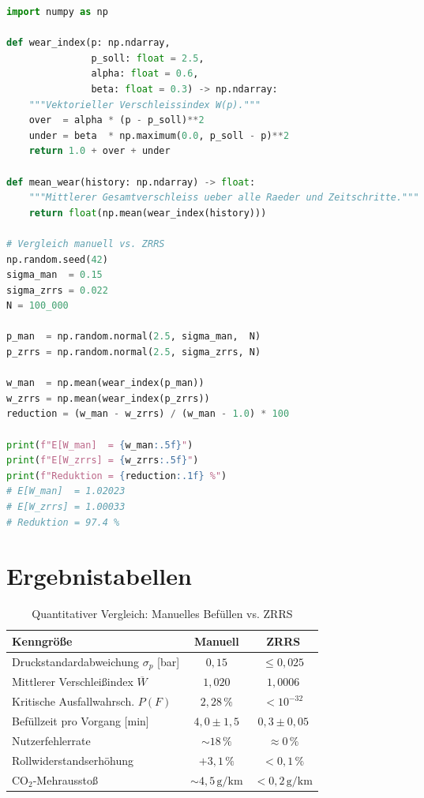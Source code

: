 ﻿\documentclass[a4paper,12pt]{article}
\theoremstyle{definition}
\begin{document}
\begin{lstlisting}[language=Python,
    caption={Verschleißindex-Berechnung und stochastische Simulation.}]
import numpy as np

def wear_index(p: np.ndarray,
               p_soll: float = 2.5,
               alpha: float = 0.6,
               beta: float = 0.3) -> np.ndarray:
    """Vektorieller Verschleissindex W(p)."""
    over  = alpha * (p - p_soll)**2
    under = beta  * np.maximum(0.0, p_soll - p)**2
    return 1.0 + over + under

def mean_wear(history: np.ndarray) -> float:
    """Mittlerer Gesamtverschleiss ueber alle Raeder und Zeitschritte."""
    return float(np.mean(wear_index(history)))

# Vergleich manuell vs. ZRRS
np.random.seed(42)
sigma_man  = 0.15
sigma_zrrs = 0.022
N = 100_000

p_man  = np.random.normal(2.5, sigma_man,  N)
p_zrrs = np.random.normal(2.5, sigma_zrrs, N)

w_man  = np.mean(wear_index(p_man))
w_zrrs = np.mean(wear_index(p_zrrs))
reduction = (w_man - w_zrrs) / (w_man - 1.0) * 100

print(f"E[W_man]  = {w_man:.5f}")
print(f"E[W_zrrs] = {w_zrrs:.5f}")
print(f"Reduktion = {reduction:.1f} %")
# E[W_man]  = 1.02023
# E[W_zrrs] = 1.00033
# Reduktion = 97.4 %
\end{lstlisting}

\section{Ergebnistabellen}

\begin{table}[H]
\centering
\caption{Quantitativer Vergleich: Manuelles Befüllen vs. ZRRS}
\label{tab:vergleich}
\begin{tabular}{lcc}
\toprule
\textbf{Kenngröße} & \textbf{Manuell} & \textbf{ZRRS} \\
\midrule
Druckstandardabweichung $\sigma_p$ [bar] & $0{,}15$ & $\leq 0{,}025$ \\
Mittlerer Verschleißindex $\overline{W}$ & $1{,}020$ & $1{,}0006$ \\
Kritische Ausfallwahrsch. $P(F)$ & $2{,}28\,\%$ & $< 10^{-32}$ \\
Befüllzeit pro Vorgang [min] & $4{,}0 \pm 1{,}5$ & $0{,}3 \pm 0{,}05$ \\
Nutzerfehlerrate & $\sim 18\,\%$ & $\approx 0\,\%$ \\
Rollwiderstandserhöhung & $+3{,}1\,\%$ & $< 0{,}1\,\%$ \\
CO$_2$-Mehrausstoß & $\sim 4{,}5\,\text{g/km}$ & $< 0{,}2\,\text{g/km}$ \\
\bottomrule
\end{tabular}
\end{table}
\end{document}
